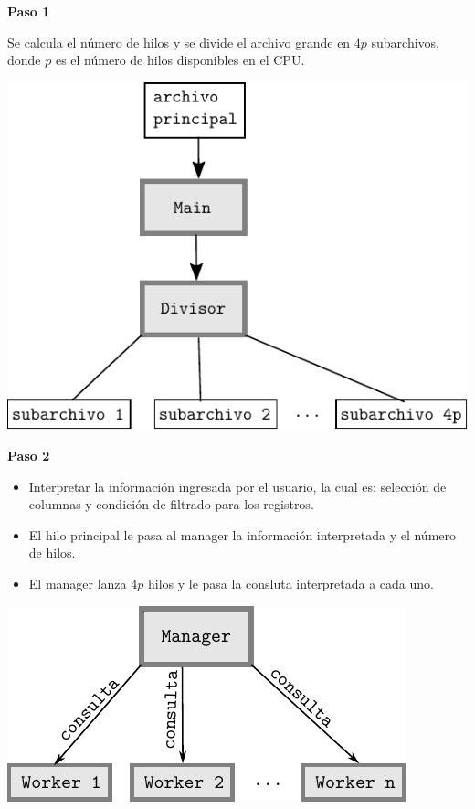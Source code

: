\documentclass{beamer}
\begin{document}
\begin{frame}

\textbf{Paso 1}

Se calcula el número de hilos y se divide el archivo grande en $4p$ subarchivos, donde $p$ es el número de hilos disponibles en el CPU.

\begin{center}
\includegraphics[scale=0.6]{division}
\end{center}

\end{frame}

\begin{frame}

\textbf{Paso 2}

\begin{itemize}
\item Interpretar la información ingresada por el usuario, la cual es: selección de columnas y condición de filtrado para los registros.
\item El hilo principal le pasa al manager la información interpretada y el número de hilos.
\item El manager lanza $4p$ hilos y le pasa la consluta interpretada a cada uno.
\end{itemize}

\begin{center}
\includegraphics[scale=0.5]{lanzar}
\end{center}

\end{frame}
\end{document}

